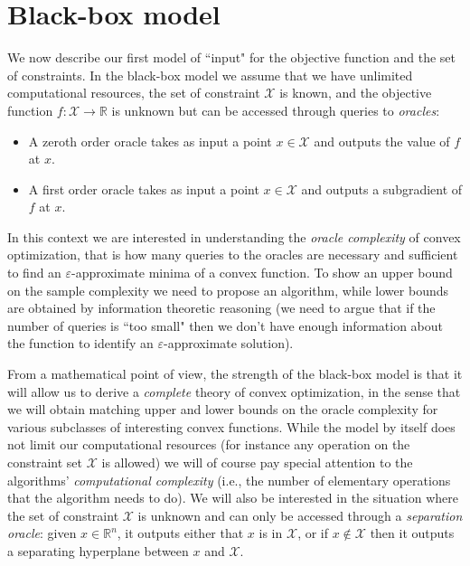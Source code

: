\documentclass[openany]{now}
\newcommand{\R}{\mathbb{R}}
\newcommand{\cX}{\mathcal{X}}
\renewcommand{\epsilon}{\varepsilon}
\begin{document}
\section{Black-box model} \label{sec:blackbox}
We now describe our first model of ``input" for the objective function and the set of constraints. In the black-box model we assume that we have unlimited computational resources, the set of constraint $\cX$ is known, and the objective function $f: \cX \rightarrow \R$ is unknown but can be accessed through queries to {\em oracles}:
\begin{itemize}
\item A zeroth order oracle takes as input a point $x \in \cX$ and outputs the value of $f$ at $x$.
\item A first order oracle takes as input a point $x \in \cX$ and outputs a subgradient of $f$ at $x$.
\end{itemize}
In this context we are interested in understanding the {\em oracle complexity} of convex optimization, that is how many queries to the oracles are necessary and sufficient to find an $\epsilon$-approximate minima of a convex function. To show an upper bound on the sample complexity we need to propose an algorithm, while lower bounds are obtained by information theoretic reasoning (we need to argue that if the number of queries is ``too small" then we don't have enough information about the function to identify an $\epsilon$-approximate solution).

From a mathematical point of view, the strength of the black-box model is that it will allow us to derive a {\em complete} theory of convex optimization, in the sense that we will obtain matching upper and lower bounds on the oracle complexity for various subclasses of interesting convex functions. While the model by itself does not limit our computational resources (for instance any operation on the constraint set $\cX$ is allowed) we will of course pay special attention to the algorithms' {\em computational complexity} (i.e., the number of elementary operations that the algorithm needs to do). We will also be interested in the situation where the set of constraint $\cX$ is unknown and can only be accessed through a {\em separation oracle}: given $x \in \R^n$, it outputs either that $x$ is in $\mathcal{X}$, or if $x \not\in \mathcal{X}$ then it outputs a separating hyperplane between $x$ and $\mathcal{X}$. 
\end{document}
